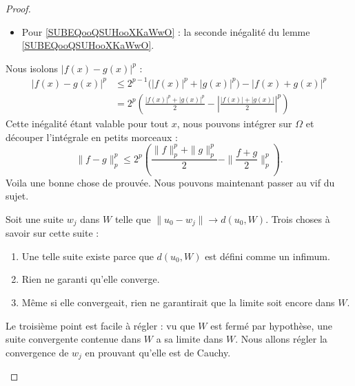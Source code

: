\begin{proof}
\begin{subproof}
\begin{itemize}
                \item Pour \eqref{SUBEQooQSUHooXKaWwO} : la seconde inégalité du lemme \ref{SUBEQooQSUHooXKaWwO}.
            \end{itemize}
            Nous isolons \( | f(x)-g(x) |^p\) :
            \begin{subequations}
                \begin{align}
                    | f(x)-g(x) |^p&\leq 2^{p-1}\big( | f(x) |^p+| g(x) |^p \big)-| f(x)+g(x) |^p\\
                    &=2^p\left( \frac{ | f(x) |^p+| g(x) |^p }{2}-\left| \frac{ | f(x) |+| g(x) | }{2} \right|^p \right)
                \end{align}
            \end{subequations}
            Cette inégalité étant valable pour tout \( x\), nous pouvons intégrer sur \( \Omega\) et découper l'intégrale en petits morceaux :
            \begin{equation}        \label{EQooVNHSooPXjFNC}
                \| f-g \|^p_p\leq 2^p\left( \frac{ \| f \|_p^p+\| g \|_p^p }{2}- \| \frac{ f+g }{2} \|_p^p \right).
            \end{equation}
            Voila une bonne chose de prouvée. Nous pouvons maintenant passer au vif du sujet.

            Soit une suite \( w_j\) dans \( W\) telle que \( \| u_0-w_j \|\to d(u_0,W)\). Trois choses à savoir sur cette suite :
            \begin{enumerate}
                \item
                    Une telle suite existe parce que \( d(u_0,W)\) est défini comme un infimum.
                \item
                    Rien ne garanti qu'elle converge.
                \item
                    Même si elle convergeait, rien ne garantirait que la limite soit encore dans \( W\).
            \end{enumerate}
            Le troisième point est facile à régler : vu que \( W\) est fermé par hypothèse, une suite convergente contenue dans \( W\) a sa limite dans \( W\). Nous allons régler la convergence de \( w_j\) en prouvant qu'elle est de Cauchy.
            

\end{subproof}
\end{proof}
